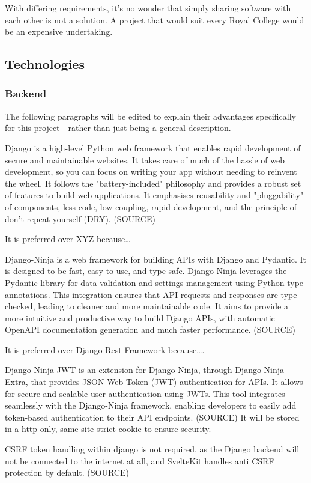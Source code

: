 \begin{multicols}{2}
With differing requirements, it’s no wonder that simply sharing software with each other is not a solution. A project that would suit every Royal College would be an expensive undertaking.
\subsection{Technologies}
\subsubsection{Backend}
The following paragraphs will be edited to explain their advantages specifically for this project - rather than just being a general description.

Django is a high-level Python web framework that enables rapid development of secure and maintainable websites. It takes care of much of the hassle of web development, so you can focus on writing your app without needing to reinvent the wheel. It follows the "battery-included" philosophy and provides a robust set of features to build web applications. It emphasises reusability and "pluggability" of components, less code, low coupling, rapid development, and the principle of don't repeat yourself (DRY). (SOURCE)

It is preferred over XYZ because…

Django-Ninja is a web framework for building APIs with Django and Pydantic. It is designed to be fast, easy to use, and type-safe. Django-Ninja leverages the Pydantic library for data validation and settings management using Python type annotations. This integration ensures that API requests and responses are type-checked, leading to cleaner and more maintainable code. It aims to provide a more intuitive and productive way to build Django APIs, with automatic OpenAPI documentation generation and much faster performance. (SOURCE)

It is preferred over Django Rest Framework because….

Django-Ninja-JWT is an extension for Django-Ninja, through Django-Ninja-Extra, that provides JSON Web Token (JWT) authentication for APIs. It allows for secure and scalable user authentication using JWTs. This tool integrates seamlessly with the Django-Ninja framework, enabling developers to easily add token-based authentication to their API endpoints. (SOURCE) It will be stored in a http only, same site strict cookie to ensure security. 

CSRF token handling within django is not required, as the Django backend will not be connected to the internet at all, and SvelteKit handles anti CSRF protection by default. (SOURCE)


\end{multicols}
